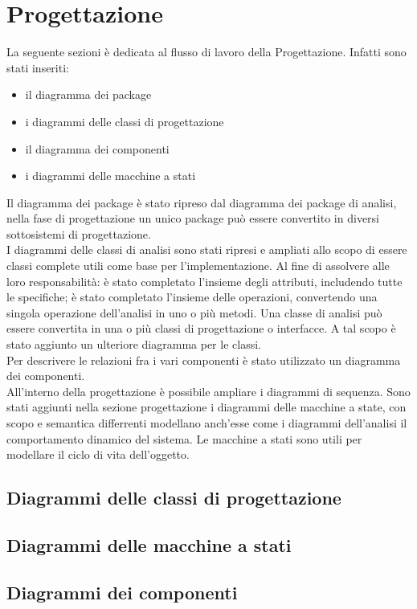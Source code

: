\documentclass[11pt,a4paper]{report}
\begin{document}
\chapter{Progettazione}
La seguente sezioni è dedicata al flusso di lavoro della Progettazione. Infatti sono stati inseriti:
\begin{itemize}
  \item il diagramma dei package
  \item i diagrammi delle classi di progettazione
  \item il diagramma dei componenti
  \item i diagrammi delle macchine a stati
\end{itemize}
Il diagramma dei package è stato ripreso dal diagramma dei package di analisi, nella fase di progettazione un unico package può essere convertito in diversi sottosistemi di progettazione.\\
I diagrammi delle classi di analisi sono stati ripresi e ampliati allo scopo di essere classi complete utili come base per l'implementazione. Al fine di assolvere alle loro responsabilità: è stato completato l'insieme degli attributi, includendo tutte le specifiche; 
è stato completato l'insieme delle operazioni, convertendo una singola operazione dell'analisi in uno o più metodi. 
Una classe di analisi può essere convertita in una o più classi di progettazione o interfacce. A tal scopo è stato aggiunto un ulteriore diagramma per le classi.\\
Per descrivere le relazioni fra i vari componenti è stato utilizzato un diagramma dei componenti.\\
All'interno della progettazione è possibile ampliare i diagrammi di sequenza. Sono stati aggiunti nella sezione progettazione i diagrammi delle macchine a state, con scopo e semantica differrenti modellano anch'esse come i diagrammi dell'analisi il comportamento dinamico del sistema. 
Le macchine a stati sono utili per modellare il ciclo di vita dell'oggetto. 


\section{Diagrammi delle classi di progettazione}
\section{Diagrammi delle macchine a stati}
\section{Diagrammi dei componenti}
\end{document}
